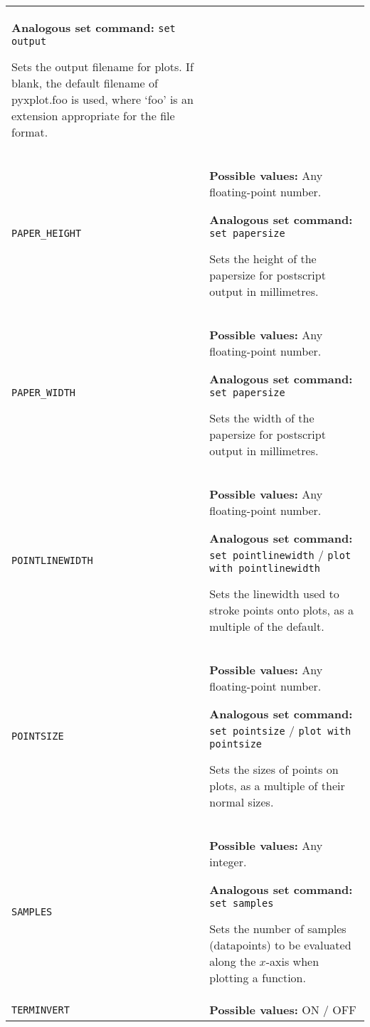 \documentclass[a4paper,onecolumn,11pt]{book}
\begin{document}
\begin{longtable}{p{3.4cm}p{9cm}}
                   \textbf{Analogous set command:} \texttt{set output}\index{set output command@\texttt{set output} command}

                   Sets the output filename for plots. If blank, the default filename of pyxplot.foo is used, where `foo' is an extension appropriate for the file format.
                   \\
\texttt{PAPER\_HEIGHT} & \textbf{Possible values:} Any floating-point number.

                   \textbf{Analogous set command:} \texttt{set papersize}\index{set papersize command@\texttt{set papersize} command}

                   Sets the height of the papersize for postscript output in millimetres.
                   \\
\texttt{PAPER\_WIDTH} & \textbf{Possible values:} Any floating-point number.

                   \textbf{Analogous set command:} \texttt{set papersize}\index{set papersize command@\texttt{set papersize} command}

                   Sets the width of the papersize for postscript output in millimetres.
                   \\
\texttt{POINTLINEWIDTH} & \textbf{Possible values:} Any floating-point number.

                   \textbf{Analogous set command:} \texttt{set pointlinewidth} / \texttt{plot with pointlinewidth}\index{set pointlinewidth command@\texttt{set pointlinewidth} command}

                   Sets the linewidth used to stroke points onto plots, as a multiple of the default.
                   \\
\texttt{POINTSIZE} & \textbf{Possible values:} Any floating-point number.

                   \textbf{Analogous set command:} \texttt{set pointsize} / \texttt{plot with pointsize}\index{set pointsize command@\texttt{set pointsize} command}

                   Sets the sizes of points on plots, as a multiple of their normal sizes.
                   \\
\texttt{SAMPLES} & \textbf{Possible values:} Any integer.

                   \textbf{Analogous set command:} \texttt{set samples}\index{set samples command@\texttt{set samples} command}

                   Sets the number of samples (datapoints) to be evaluated along the $x$-axis when plotting a function.
                   \\
\texttt{TERMINVERT} & \textbf{Possible values:} ON / OFF


\end{longtable}
\end{document}
